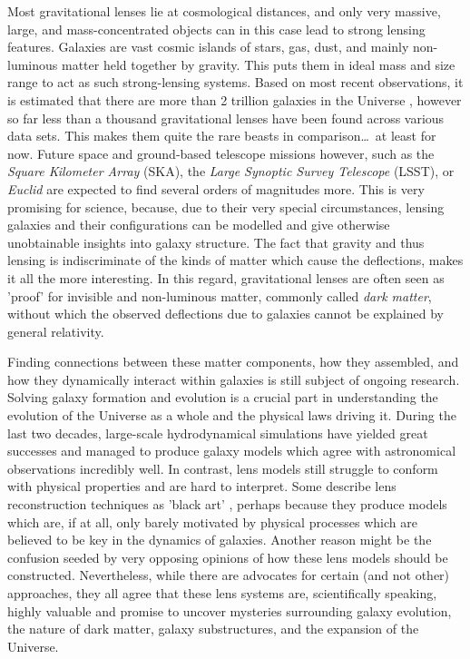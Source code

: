 Most gravitational lenses lie at cosmological distances, and only very massive,
large, and mass-concentrated objects can in this case lead to strong lensing
features.  Galaxies are vast cosmic islands of stars, gas, dust, and mainly
non-luminous matter held together by gravity.  This puts them in ideal mass and
size range to act as such strong-lensing systems.  Based on most recent
observations, it is estimated that there are more than 2 trillion galaxies
in the Universe , however so far less than a thousand
gravitational lenses have been found across various data sets.  This makes them
quite the rare beasts in comparison\dots\ at least for now.  Future space and
ground-based telescope missions however, such as the \textit{Square Kilometer
Array} (SKA), the \textit{Large Synoptic Survey Telescope} (LSST), or
\textit{Euclid} are expected to find several orders of magnitudes more.  This is
very promising for science, because, due to their very special circumstances,
lensing galaxies and their configurations can be modelled and give otherwise
unobtainable insights into galaxy structure.  The fact that gravity and thus
lensing is indiscriminate of the kinds of matter which cause the deflections,
makes it all the more interesting.  In this regard, gravitational lenses are
often seen as 'proof' for invisible and non-luminous matter, commonly called \textit{dark
matter}, without which the observed deflections due to galaxies cannot be
explained by general relativity.

Finding connections between these matter components, how they assembled, and how
they dynamically interact within galaxies is still subject of ongoing research.
Solving galaxy formation and evolution is a crucial part in understanding the
evolution of the Universe as a whole and the physical laws driving it.  During
the last two decades, large-scale hydrodynamical simulations have yielded great
successes and managed to produce galaxy models which agree with astronomical
observations incredibly well.  In contrast, lens models still struggle to
conform with physical properties and are hard to interpret.  Some describe lens
reconstruction techniques as 'black art' , perhaps because
they produce models which are, if at all, only barely motivated by physical
processes which are believed to be key in the dynamics of galaxies. Another
reason might be the confusion seeded by very opposing opinions
of how these lens models should be constructed.  Nevertheless, while there are
advocates for certain (and not other) approaches, they all agree that these lens
systems are, scientifically speaking, highly valuable and promise to uncover
mysteries surrounding galaxy evolution, the nature of dark matter, galaxy
substructures, and the expansion of the Universe.


